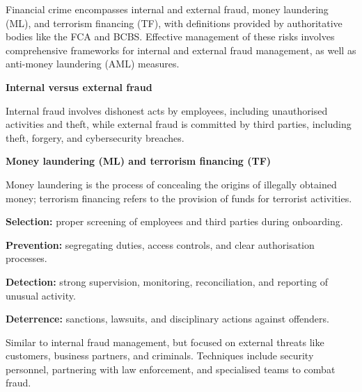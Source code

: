 

Financial crime encompasses internal and external fraud, money laundering (ML),
and terrorism financing (TF), with definitions provided by authoritative bodies
like the FCA and BCBS. Effective management of these risks involves comprehensive
frameworks for internal and external fraud management, as well as anti-money
laundering (AML) measures.

\begin{orkeybox}
{\sffamily\bfseries\fontsize{8.6}{10}\selectfont\color{navy}Internal versus
external fraud}\par
\vspace{2pt}
Internal fraud involves dishonest acts by employees, including unauthorised
activities and theft, while external fraud is committed by third parties,
including theft, forgery, and cybersecurity breaches.\par
\vspace{7pt}
{\sffamily\bfseries\fontsize{8.6}{10}\selectfont\color{navy}Money laundering (ML)
and terrorism financing (TF)}\par
\vspace{2pt}
Money laundering is the process of concealing the origins of illegally obtained
money; terrorism financing refers to the provision of funds for terrorist
activities.
\end{orkeybox}


\begin{lettered}
\item \textbf{Selection:} proper screening of employees and third parties during
onboarding.
\item \textbf{Prevention:} segregating duties, access controls, and clear
authorisation processes.
\item \textbf{Detection:} strong supervision, monitoring, reconciliation, and
reporting of unusual activity.
\item \textbf{Deterrence:} sanctions, lawsuits, and disciplinary actions against
offenders.
\end{lettered}


Similar to internal fraud management, but focused on external threats like
customers, business partners, and criminals. Techniques include security
personnel, partnering with law enforcement, and specialised teams to combat
fraud.

